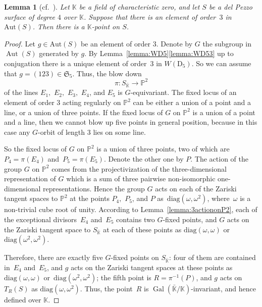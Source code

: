 \documentclass[12pt]{amsart}
\newcounter{cequation}[section]
\newtheorem{lemma}[cequation]{Lemma}
\theoremstyle{definition}
\theoremstyle{remark}
\newcommand{\PP}{\mathbb{P}}
\newcommand{\KK}{\mathbb{K}}
\newcommand{\Aut}{\operatorname{Aut}}
\newcommand{\Gal}{\operatorname{Gal}}
\begin{document}
\begin{lemma}[{cf.~\cite[proof of Lemma 5.5]{Trepalin-highdegree}}]
\label{lemma:dp4order3}
Let $\KK$ be a field of characteristic zero, and let $S$ be a del Pezzo surface of degree $4$ over $\KK$. Suppose that there is an element of order~$3$ in $\mathrm{Aut}(S)$. Then there is a $\KK$-point on $S$.
\end{lemma}

\begin{proof}
Let $g \in \mathrm{Aut}(S)$ be an element of order $3$. Denote by $G$ the subgroup in~\mbox{$\Aut(S)$} generated by $g$.
By Lemma~\ref{lemma:WD5}\ref{lemma:WD53}  up to conjugation there is a unique element of order~$3$ in $W(\mathrm{D}_5)$.
So we can assume that $g=(123)\in\mathfrak{S}_5$. Thus, the blow down
$$
\pi \colon S_{\bar{\KK}} \to \mathbb{P}^2
$$
of the lines $E_1,$ $E_2,$ $E_3,$ $E_4$, and $E_5$ is $G$-equivariant.
The fixed locus of an element of order $3$ acting regularly on $\mathbb{P}^2$
can be either a union of a point and a line, or a union of three points.
If the fixed locus of $G$ on $\mathbb{P}^2$ is a union of a point and a line,
then we cannot blow up five points in general position,
because in this case any $G$-orbit of length $3$ lies on some line.

So the fixed locus of $G$ on $\mathbb{P}^2$ is a union of three points,
two of which are~\mbox{$P_4=\pi(E_4)$} and~\mbox{$P_5=\pi(E_5)$}.
Denote the other one by $P$.
The action of the group $G$ on $\PP^2$ comes from the projectivization of
the three-dimensional representation of $G$ which is a sum of three
pairwise non-isomorphic one-dimensional representations. Hence
the group $G$ acts on each of the Zariski tangent spaces to $\PP^2$
at the points $P_4,$ $P_5$,
and $P$ as~\mbox{$\mathrm{diag}(\omega, \omega^2)$},
where~$\omega$ is a non-trivial cube root of unity.
According to Lemma~\ref{lemma:3actiononP2},
each of the exceptional divisors~$E_4$ and~$E_5$ contains two
$G$-fixed points,
and $G$ acts on the Zariski tangent space to $S_{\bar{\KK}}$ at each of these
points as $\mathrm{diag}(\omega, \omega)$
or $\mathrm{diag}(\omega^2, \omega^2)$.

Therefore, there are exactly five $G$-fixed points on $S_{\bar{\KK}}$:
four of them are contained in~$E_4$ and~$E_5$,
and $g$ acts on the Zariski tangent spaces at these points
as $\mathrm{diag}(\omega, \omega)$
or~\mbox{$\mathrm{diag}(\omega^2, \omega^2)$};
the fifth point is
$R=\pi^{-1}(P)$, and $g$ acts on $T_R(S)$
as $\mathrm{diag}(\omega, \omega^2)$. Thus, the point~$R$
is $\Gal(\bar{\KK}/\KK)$-invariant,
and hence defined over $\KK$.
\end{proof}
\end{document}

